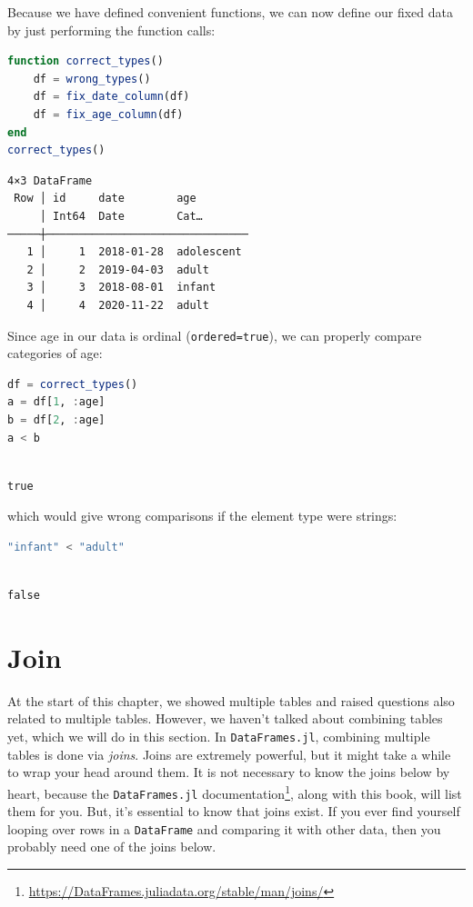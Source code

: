 \documentclass[
  notoc %
]{tufte-book}
\DeclareRobustCommand{\href}[2]{#2\footnote{\url{#1}}}
\newcommand{\passthrough}[1]{#1}
\begin{document}
Because we have defined convenient functions, we can now define our
fixed data by just performing the function calls:

\begin{lstlisting}[language=Julia]
function correct_types()
    df = wrong_types()
    df = fix_date_column(df)
    df = fix_age_column(df)
end
correct_types()
\end{lstlisting}

\begin{lstlisting}[language=Output]
4×3 DataFrame
 Row │ id     date        age
     │ Int64  Date        Cat…
─────┼───────────────────────────────
   1 │     1  2018-01-28  adolescent
   2 │     2  2019-04-03  adult
   3 │     3  2018-08-01  infant
   4 │     4  2020-11-22  adult
\end{lstlisting}

Since age in our data is ordinal
(\passthrough{\lstinline!ordered=true!}), we can properly compare
categories of age:

\begin{lstlisting}[language=Julia]
df = correct_types()
a = df[1, :age]
b = df[2, :age]
a < b
\end{lstlisting}

\begin{lstlisting}[language=Output]

true

\end{lstlisting}

which would give wrong comparisons if the element type were strings:

\begin{lstlisting}[language=Julia]
"infant" < "adult"
\end{lstlisting}

\begin{lstlisting}[language=Output]

false

\end{lstlisting}

\hypertarget{sec:join}{%
\section{Join}\label{sec:join}}

At the start of this chapter, we showed multiple tables and raised
questions also related to multiple tables. However, we haven't talked
about combining tables yet, which we will do in this section. In
\passthrough{\lstinline!DataFrames.jl!}, combining multiple tables is
done via \emph{joins}. Joins are extremely powerful, but it might take a
while to wrap your head around them. It is not necessary to know the
joins below by heart, because the
\href{https://DataFrames.juliadata.org/stable/man/joins/}{\passthrough{\lstinline!DataFrames.jl!}
documentation}, along with this book, will list them for you. But, it's
essential to know that joins exist. If you ever find yourself looping
over rows in a \passthrough{\lstinline!DataFrame!} and comparing it with
other data, then you probably need one of the joins below.
\end{document}
